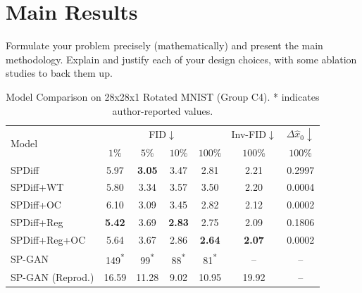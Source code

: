 \documentclass{article}
\begin{document}
\section{Main Results}
Formulate your problem precisely (mathematically) and present the main methodology. Explain and justify each of your design choices, with some ablation studies to back them up.

\begin{table}[t]
	\centering
	\caption{Model Comparison on 28x28x1 Rotated MNIST (Group C4).
		\footnotesize{*} indicates author-reported values.
	}
	\setlength\tabcolsep{12pt}
	\begin{tabular}{@{}lcccccc@{}}
		\toprule
		\multirow{2}{*}{Model} & \multicolumn{4}{c}{FID$\downarrow$} & \multicolumn{1}{c}{Inv-FID$\downarrow$} & \multicolumn{1}{c}{$\Delta\hat x_0\downarrow$}                                                   \\  \cmidrule{2-7}
		                       & $1\%$                               & $5\%$                                   & $10\%$                                         & $100\%$               & $100\%$       & $100\%$ \\ \midrule
		SPDiff                 & 5.97                                & \textbf{3.05}                           & 3.47                                           & 2.81                  & 2.21          & 0.2997  \\
		SPDiff+WT              & 5.80                                & 3.34                                    & 3.57                                           & 3.50                  & 2.20          & 0.0004  \\
		SPDiff+OC              & 6.10                                & 3.09                                    & 3.45                                           & 2.82                  & 2.12          & 0.0002  \\
		SPDiff+Reg             & \textbf{5.42}                       & 3.69                                    & \textbf{2.83}                                  & 2.75                  & 2.09          & 0.1806  \\
		SPDiff+Reg+OC          & 5.64                                & 3.67                                    & 2.86                                           & \textbf{2.64}         & \textbf{2.07} & 0.0002  \\
		SP-GAN                 & 149\textsuperscript{*}              & 99\textsuperscript{*}                   & 88\textsuperscript{*}                          & 81\textsuperscript{*} & --            & --      \\
		SP-GAN (Reprod.)       & 16.59                               & 11.28                                   & 9.02                                           & 10.95                 & 19.92         & --      \\ \bottomrule
	\end{tabular}
	\label{tab:fid-rot-mnist}
\end{table}
\end{document}
